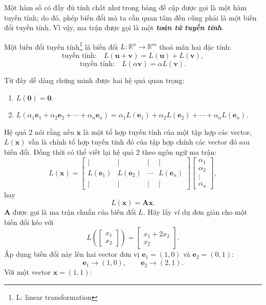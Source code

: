 Một hàm số có đầy đủ tính chất như trong bảng đề cập được gọi là một hàm tuyến tính; do đó, phép biến đổi mà ta cần quan tâm đến cũng phải là một biến đổi tuyến tính. Vì vậy, ma trận được gọi là một \textbf{\emph{toán tử tuyến tính}}.
\begin{definition}
    Một biến đổi tuyến tính\footnote{L: linear transformation} là biến đổi \(L: \mathbb{R}^n \rightarrow\mathbb{R}^m\) thoả mãn hai đặc tính:
    \[\text{tuyến tính:}\quad L(\mathbf{u}+\mathbf{v})=L(\mathbf{u})+L(\mathbf{v}),\]
    \[\text{tuyến tính:}\quad L(\alpha\mathbf{v})=\alpha L(\mathbf{v}).\]
\end{definition}
Từ đây dễ dàng chứng minh được hai hệ quả quan trọng:
\begin{enumerate}
    \item \(L(\mathbf{0})=\mathbf{0}\).
    \item \(L(\alpha_{1}\mathbf{e}_1+\alpha_2 \mathbf{e}_2 +\cdots +\alpha_n \mathbf{e}_{n})=\alpha_1 L(\mathbf{e}_1)+\alpha_2 L(\mathbf{e}_2)+\cdots +\alpha_n L(\mathbf{e}_n)\).
\end{enumerate}
Hệ quả 2 nói rằng nếu \(\mathbf{x}\) là một tổ hợp tuyến tính của một tập hợp các vector, \(L(\mathbf{x})\) vẫn là chính tổ hợp tuyến tính đó của tập hợp chính các vector đó sau biến đổi. 
Đồng thời có thể viết lại hệ quả 2 theo ngôn ngữ ma trận:
\[L(\mathbf{x})=\begin{bmatrix}
    \lvert & \lvert &\lvert &\lvert\\
    L(\mathbf{e}_1)&L(\mathbf{e}_2)&\cdots&L(\mathbf{e}_n)\\
     \lvert & \lvert &\lvert &\lvert
\end{bmatrix}\begin{bmatrix}
    \alpha_1 \\\alpha_2 \\\vdots\\ \alpha_n
\end{bmatrix},\] hay \[L(\mathbf{x})=\mathbf{A}\mathbf{x}.\]
\(\mathbf{A}\) được gọi là ma trận chuẩn của biến đổi \(L\). Hãy lấy ví dụ đơn giản cho một biến đổi kéo với 
\[L\left(\begin{bmatrix}
    x_1 \\x_2
\end{bmatrix}\right)=\begin{bmatrix}
    x_1 +2x_2 \\x_2
\end{bmatrix}.\] Áp dụng biến đổi này lên hai vector đơn vị \(\mathbf{e}_1 =(1,0)\) và \(\mathbf{e}_2 =(0,1)\):
\[\mathbf{e}_1 \rightarrow (1,0),\qquad \mathbf{e}_2 \rightarrow (2,1).\] Với một vector \(\mathbf{x}=(1,1)\):
